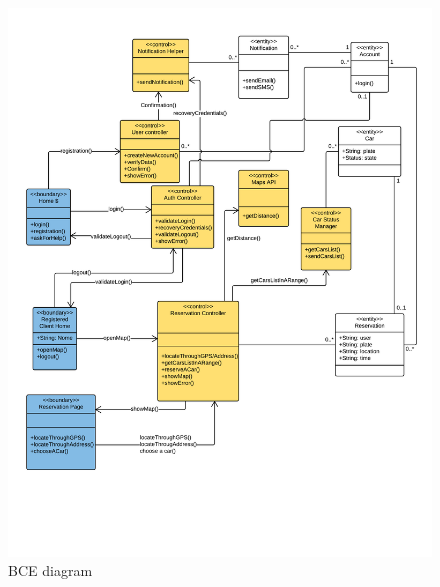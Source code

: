 \begin{figure}[H]
\centering
\includegraphics[scale=0.6,keepaspectratio]{../images/diagrams/bce.png}
\caption{BCE diagram}
\end{figure}

